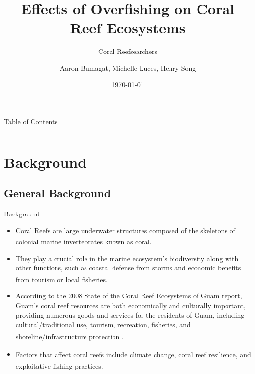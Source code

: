 \documentclass{beamer}
\title[]{Effects of Overfishing on Coral Reef Ecosystems}
\subtitle{Coral Reefsearchers}
\author{Aaron Bumagat, Michelle Luces, Henry Song }
\institute{University of Guam}
\date{\today}
\begin{document}
\frame{\titlepage}

\AtBeginSection[]{
    \begin{frame}{}
        \frametitle{}
        \setcounter{tocdepth}{2}
        \tableofcontents[currentsection, sections = \thesection]
        \setcounter{tocdepth}{1}
    \end{frame}
}

\begin{frame}{Table of Contents}
    \begin{columns}
        \begin{column}{0.5\textwidth}
            \tableofcontents[sections=1-2]
        \end{column}
        \begin{column}{0.5\textwidth}
            \tableofcontents[sections=3-4]
        \end{column}
    \end{columns}
\end{frame}


\section{Background}
\subsection{General Background}
\begin{frame}{Background}
    \begin{itemize}
        \item<1-> Coral Reefs are large underwater structures composed of the skeletons of colonial marine invertebrates known as coral\textsuperscript{\cite{ross}}.
         \item<2-> They play a crucial role in the marine ecosystem's biodiversity along with other functions, such as coastal defense from storms and economic benefits from tourism or local fisheries\textsuperscript{\cite{04_mathanalysis}}.
         \item<3-> According to the 2008 State of the Coral Reef Ecosystems of Guam report, Guam’s coral reef resources are both economically and culturally important, providing numerous goods and services for the residents of Guam, including cultural/traditional use, tourism, recreation, fisheries, and shoreline/infrastructure protection \textsuperscript{\cite{guamwebsite}}.
         \item<4-> Factors that affect coral reefs include climate change, coral reef resilience\textsuperscript{\cite{02_Riegl_Purkis_Model}}, and exploitative fishing practices\textsuperscript{\cite{05_quintero_machuca_cotto_bradley_ríos-soto_2016}}.
    \end{itemize}
\end{frame}
\end{document}
